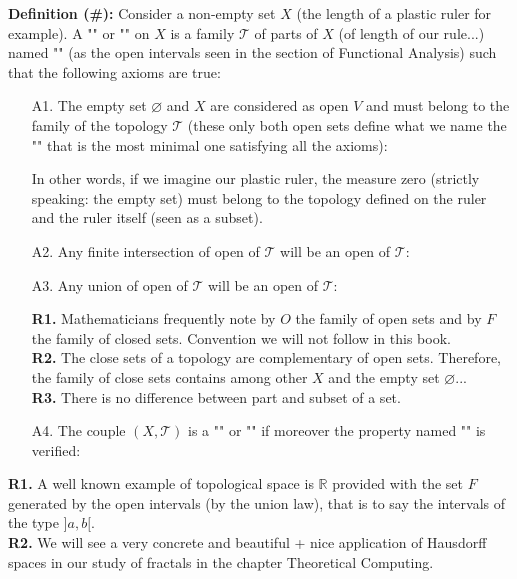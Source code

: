 	\textbf{Definition (\#\mydef):} Consider a non-empty set $X$ (the length of a plastic ruler for example). A "" or "" on $X$ is a family $\mathcal{T}$ of parts of $X$ (of length of our rule...) named ""  (as the open intervals seen in the section  of Functional Analysis) such that the following axioms are true:
	\begin{enumerate}
		\item[A1.] The empty set $\varnothing$ and $X$ are considered as open $V$ and must belong to the family of the topology $\mathcal{T}$ (these only both open sets define what we name the "" that is the most minimal one satisfying all the axioms):
		
		In other words, if we imagine our plastic ruler, the measure zero (strictly speaking: the empty set) must belong to the topology defined on the ruler and the ruler itself (seen as a subset).
		
		\item[A2.] Any finite intersection of open of $\mathcal{T}$ will be an open of $\mathcal{T}$:
		
		
		\item[A3.] Any union of open of $\mathcal{T}$ will be an open of $\mathcal{T}$:
		
		\begin{tcolorbox}[title=Remarks,colframe=black,arc=10pt]
		\textbf{R1.} Mathematicians frequently note by $O$ the family of open sets and by $F$ the family of closed sets. Convention we will not follow in this book.\\

		\textbf{R2.} The close sets of a topology are complementary of open sets. Therefore, the family of  close sets contains among other $X$ and the empty set $\varnothing$...\\
	
		\textbf{R3.} There is no difference between part and subset of a set.
		\end{tcolorbox}
		
		\item[A4.] The couple $(X,\mathcal{T})$ is a "" or "" if moreover the property named "" is verified:
				
	\end{enumerate}
	\begin{tcolorbox}[title=Remarks,colframe=black,arc=10pt]
		\textbf{R1.} A well known example of topological space is $\mathbb{R}$ provided with the set $F$ generated by the open intervals (by the union law), that is to say the intervals of the type $] a, b [$.\\
		
		\textbf{R2.} We will see a very concrete and beautiful + nice application of Hausdorff spaces in our study of fractals in the chapter Theoretical Computing.
	\end{tcolorbox}
	
